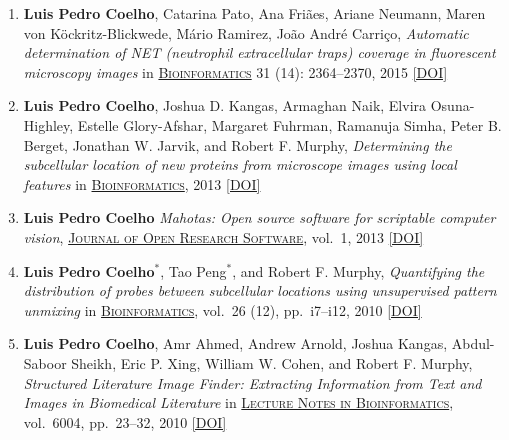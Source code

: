 \documentclass{article}
\newcommand\showdoi[1]{%
    \href{http://dx.doi.org/#1}{[DOI]}%
}
\newcommand\pubname[1]{\textsc{\uline{#1}}}
\newcommand\contribution[1]{\relax}
\newcommand\costar{${}^{*}$}
\begin{document}
\begin{enumerate}[resume]
\item \textbf{Luis Pedro Coelho}, Catarina Pato, Ana Friães, Ariane Neumann,
Maren von Köckritz-Blickwede, Mário Ramirez, João André Carriço,
\emph{Automatic determination of NET (neutrophil extracellular traps) coverage
in fluorescent microscopy images} in \pubname{Bioinformatics} 31 (14):
2364--2370, 2015 \showdoi{10.1093/bioinformatics/btv156}
\contribution{I conceived and implemented the algorithm, and wrote the
manuscript.}

\item \textbf{Luis Pedro Coelho}, Joshua D. Kangas, Armaghan Naik, Elvira
Osuna-Highley, Estelle Glory-Afshar, Margaret Fuhrman, Ramanuja Simha, Peter B.
Berget, Jonathan W. Jarvik, and Robert F. Murphy, \emph{Determining the
subcellular location of new proteins from microscope images using local
features} in \pubname{Bioinformatics}, 2013 \showdoi{10.1093/bioinformatics/btt392}
\contribution{I designed and implemented the proposed algorithm, collected
microscopy data (in collaboration with other authors), and wrote the
manuscript.}

\item \textbf{Luis Pedro Coelho} \emph{Mahotas: Open source software for
scriptable computer vision}, \pubname{Journal of Open Research Software}, vol.\
1, 2013 \showdoi{10.5334/jors.ac}
\contribution{I implemented the underlying computer vision software and the manuscript.}

\item \textbf{Luis Pedro Coelho}\costar, Tao Peng\costar, and Robert F.
Murphy, \emph{Quantifying the distribution of probes between subcellular
locations using unsupervised pattern unmixing} in \pubname{Bioinformatics},
vol.\ 26 (12), pp.\ i7--i12, 2010 \showdoi{10.1093/bioinformatics/btq220}
\contribution{I conceived of and implemented one of the methods presented and
wrote the manuscript.}

\item \textbf{Luis Pedro Coelho}, Amr Ahmed, Andrew Arnold, Joshua Kangas,
Abdul-Saboor Sheikh, Eric P. Xing, William W. Cohen, and Robert F. Murphy,
\emph{Structured Literature Image Finder: Extracting Information from Text and
Images in Biomedical Literature} in \pubname{Lecture Notes in Bioinformatics},
vol.\ 6004, pp.\ 23--32, 2010 \showdoi{10.1007/978-3-642-13131-8_4}
\contribution{With the paper below, this forms a package on the SLIF project,
where I enhanced the image analysis pipeline (for the analysis of figures in
published scientific literature). I wrote the first draft of this manuscript
and helped draft the one below.}

\end{enumerate}
\end{document}
